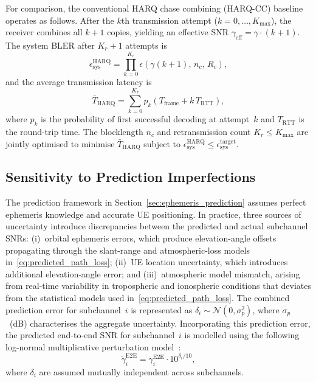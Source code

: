 \documentclass[journal]{IEEEtran}
\begin{document}
For comparison, the conventional HARQ chase combining
(HARQ-CC) baseline operates as follows. After the $k$th
transmission attempt ($k = 0,\ldots,K_{\max}$), the receiver
combines all $k+1$ copies, yielding an effective SNR
$\gamma_{\mathrm{eff}} = \gamma \cdot (k+1)$.
The system BLER after $K_r+1$ attempts is
\begin{equation}
\epsilon_{\mathrm{sys}}^{\mathrm{HARQ}} =
\prod_{k=0}^{K_r} \epsilon\!\left(\gamma(k{+}1),\, n_c,\, R_c\right),
\label{eq:harq_bler}
\end{equation}
and the average transmission latency is
\begin{equation}
\bar{T}_{\mathrm{HARQ}} = \sum_{k=0}^{K_r} p_k
\left(T_{\mathrm{frame}} + k\,T_{\mathrm{RTT}}\right),
\label{eq:harq_latency}
\end{equation}
where $p_k$ is the probability of first successful decoding at
attempt~$k$ and $T_{\mathrm{RTT}}$ is the round-trip time.
The blocklength $n_c$ and retransmission count
$K_r \leq K_{\max}$ are jointly optimised to minimise
$\bar{T}_{\mathrm{HARQ}}$ subject to
$\epsilon_{\mathrm{sys}}^{\mathrm{HARQ}} \leq
\epsilon_{\mathrm{sys}}^{\mathrm{target}}$.


\subsection{Sensitivity to Prediction Imperfections}
\label{sec:robustness_prediction}

The prediction framework in Section~\ref{sec:ephemeris_prediction}
assumes perfect ephemeris knowledge and accurate UE positioning.
In practice, three sources of uncertainty introduce discrepancies
between the predicted and actual subchannel SNRs:
(i)~orbital ephemeris errors, which produce elevation-angle
offsets propagating through the slant-range
and atmospheric-loss models in~\eqref{eq:predicted_path_loss};
(ii)~UE location uncertainty, which introduces additional
elevation-angle error; and
(iii)~atmospheric model mismatch, arising from real-time
variability in tropospheric and ionospheric conditions that
deviates from the statistical models used
in~\eqref{eq:predicted_path_loss}.  The combined prediction error for subchannel~$i$ is represented as $\delta_i \sim \mathcal{N}(0, \sigma_p^2)$, where $\sigma_p$~(dB) characterises the aggregate uncertainty. Incorporating this prediction error, the predicted end-to-end SNR for subchannel~$i$ is modelled using the following log-normal multiplicative perturbation model~\cite{Papoulis2002}:
\begin{equation}
\check{\gamma}_i^{\mathrm{E2E}} =
\gamma_i^{\mathrm{E2E}} \cdot 10^{\delta_i/10},
\label{eq:snr_mismatch}
\end{equation}
where $\delta_i$ are assumed mutually independent across subchannels.
\end{document}
